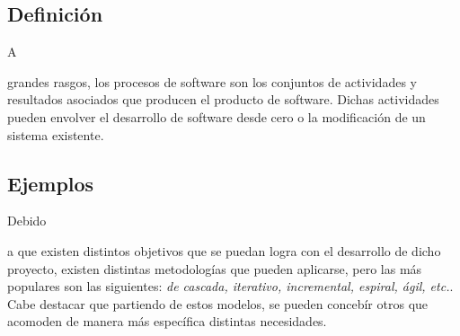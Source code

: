\documentclass[stu, 12pt, letterpaper, donotrepeattitle, floatsintext, natbib]{apa7}
\begin{document}
\subsection{Definición}
A \begin{justifying}
    grandes rasgos, los procesos de software son los conjuntos de actividades y resultados asociados que producen el producto de software.
    Dichas actividades pueden envolver el desarrollo de software desde cero o la modificación de un sistema existente. \citep{geeksforgeeks-2021, elgabry-2022,unknown-author-no-dateA}\par
  \end{justifying}
\vspace{\baselineskip}
\subsection{Ejemplos}
Debido \begin{justifying}
    a que existen distintos objetivos que se puedan logra con el desarrollo de dicho proyecto, existen distintas metodologías que pueden aplicarse, pero las más populares son las siguientes: \citep{vats-2022} \emph{de cascada, iterativo, incremental, espiral, ágil, etc.}.
    Cabe destacar que partiendo de estos modelos, se pueden concebír otros que acomoden de manera más específica distintas necesidades.\par
\end{justifying}
\end{document}
